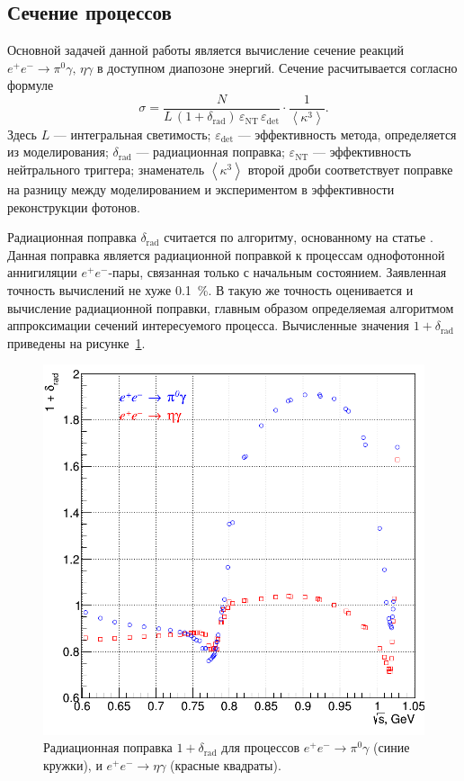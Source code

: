 \subsection{Сечение процессов}

Основной задачей данной работы является вычисление сечение реакций
$e^+e^- \to \pi^0 \gamma, \, \eta \gamma$ в доступном диапозоне энергий.
Сечение расчитывается согласно формуле
\begin{equation}
	\sigma = \frac{ N } { L \, (1+\delta_{\text{rad}}) \, \varepsilon_{\text{NT}} \,
	\varepsilon_{\text{det}}} \cdot  
    \frac{1}{\left\langle \kappa^3 \right\rangle} .
\end{equation}
Здесь $L$ --- интегральная светимость;
$\varepsilon_{\text{det}}$ --- эффективность метода, определяется из моделирования;
$\delta_{\text{rad}}$ --- радиационная поправка;
$\varepsilon_{\text{NT}}$ --- эффективность нейтрального триггера;
знаменатель $\left\langle \kappa^3 \right\rangle$ второй дроби соответствует поправке
на разницу между моделированием и экспериментом в эффективности реконструкции фотонов.

Радиационная поправка $\delta_{\text{rad}}$ считается по алгоритму, основанному на статье \cite{Kuraev1985}.
Данная поправка является радиационной поправкой к процессам однофотонной аннигиляции $e^+ e^-$-пары,
связанная только с начальным состоянием.
Заявленная точность вычислений не хуже \SI{0.1}{\percent}.
В такую же точность оценивается и вычисление радиационной поправки,
главным образом определяемая алгоритмом аппроксимации сечений интересуемого процесса.
Вычисленные значения $1+\delta_{\text{rad}}$ приведены на рисунке~\ref{fig:rad_corr}.

\begin{figure}[htbp]
	\centering
	\includegraphics[width=.5\textwidth]{img/rad_corr_for_pseudodisser.png}
	\caption{Радиационная поправка $1+\delta_{\text{rad}}$ для процессов
		$e^+ e^- \to \pi^0 \gamma$ (синие кружки),
		и $e^+ e^- \to \eta \gamma$ (красные квадраты).}\label{fig:rad_corr}
\end{figure}

